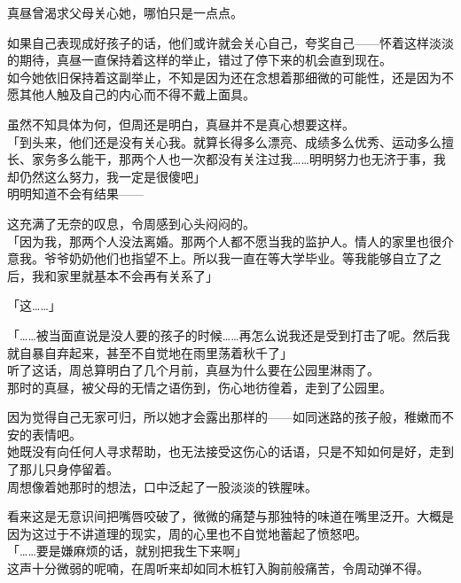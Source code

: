 真昼曾渴求父母关心她，哪怕只是一点点。

如果自己表现成好孩子的话，他们或许就会关心自己，夸奖自己——怀着这样淡淡的期待，真昼一直保持着这样的举止，错过了停下来的机会直到现在。\\

如今她依旧保持着这副举止，不知是因为还在念想着那细微的可能性，还是因为不愿其他人触及自己的内心而不得不戴上面具。

虽然不知具体为何，但周还是明白，真昼并不是真心想要这样。\\

「到头来，他们还是没有关心我。就算长得多么漂亮、成绩多么优秀、运动多么擅长、家务多么能干，那两个人也一次都没有关注过我……明明努力也无济于事，我却仍然这么努力，我一定是很傻吧」\\

明明知道不会有结果——

这充满了无奈的叹息，令周感到心头闷闷的。\\

「因为我，那两个人没法离婚。那两个人都不愿当我的监护人。情人的家里也很介意我。爷爷奶奶他们也指望不上。所以我一直在等大学毕业。等我能够自立了之后，我和家里就基本不会再有关系了」

「这……」

「……被当面直说是没人要的孩子的时候……再怎么说我还是受到打击了呢。然后我就自暴自弃起来，甚至不自觉地在雨里荡着秋千了」\\

听了这话，周总算明白了几个月前，真昼为什么要在公园里淋雨了。\\

那时的真昼，被父母的无情之语伤到，伤心地彷徨着，走到了公园里。

因为觉得自己无家可归，所以她才会露出那样的——如同迷路的孩子般，稚嫩而不安的表情吧。\\

她既没有向任何人寻求帮助，也无法接受这伤心的话语，只是不知如何是好，走到了那儿只身停留着。\\

周想像着她那时的想法，口中泛起了一股淡淡的铁腥味。

看来这是无意识间把嘴唇咬破了，微微的痛楚与那独特的味道在嘴里泛开。大概是因为这过于不讲道理的现实，周的心里也不自觉地蓄起了愤怒吧。\\

「……要是嫌麻烦的话，就别把我生下来啊」\\

这声十分微弱的呢喃，在周听来却如同木桩钉入胸前般痛苦，令周动弹不得。\\

